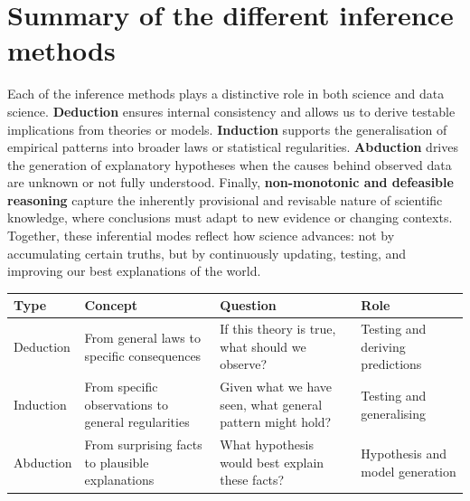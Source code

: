\documentclass[
  12pt,
]{book}
\begin{document}
\section{Summary of the different inference methods}\label{summary-of-the-different-inference-methods}

Each of the inference methods plays a distinctive role in both science and data science. \textbf{Deduction} ensures internal consistency and allows us to derive testable implications from theories or models. \textbf{Induction} supports the generalisation of empirical patterns into broader laws or statistical regularities. \textbf{Abduction} drives the generation of explanatory hypotheses when the causes behind observed data are unknown or not fully understood. Finally, \textbf{non-monotonic and defeasible reasoning} capture the inherently provisional and revisable nature of scientific knowledge, where conclusions must adapt to new evidence or changing contexts. Together, these inferential modes reflect how science advances: not by accumulating certain truths, but by continuously updating, testing, and improving our best explanations of the world.

\begin{longtable}[]{@{}
  >{\raggedright\arraybackslash}p{}
  >{\raggedright\arraybackslash}p{}
  >{\raggedright\arraybackslash}p{}
  >{\raggedright\arraybackslash}p{}@{}}
\toprule\noalign{}
\begin{minipage}[b]{\linewidth}\raggedright
Type
\end{minipage} & \begin{minipage}[b]{\linewidth}\raggedright
Concept
\end{minipage} & \begin{minipage}[b]{\linewidth}\raggedright
Question
\end{minipage} & \begin{minipage}[b]{\linewidth}\raggedright
Role
\end{minipage} \\
\midrule\noalign{}
\endhead
\bottomrule\noalign{}
\endlastfoot
Deduction & From general laws to specific consequences & If this theory is true, what should we observe? & Testing and deriving predictions \\
Induction & From specific observations to general regularities & Given what we have seen, what general pattern might hold? & Testing and generalising \\
Abduction & From surprising facts to plausible explanations & What hypothesis would best explain these facts? & Hypothesis and model generation \\
\end{longtable}
\end{document}
